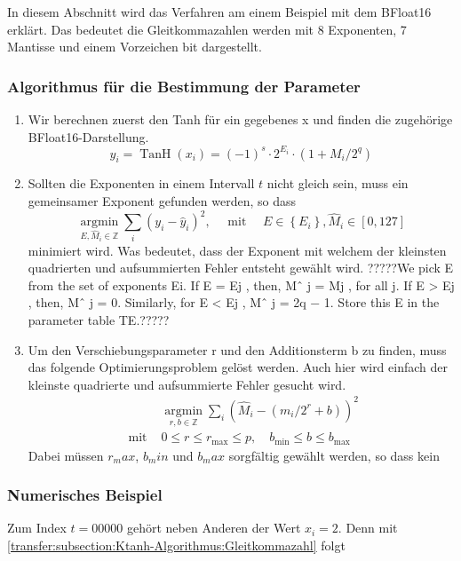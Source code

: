 
In diesem Abschnitt wird das Verfahren am einem Beispiel mit dem BFloat16 erklärt. Das bedeutet die Gleitkommazahlen werden mit 8 Exponenten, 7 Mantisse und einem Vorzeichen bit dargestellt.

\subsubsection{Algorithmus für die Bestimmung der Parameter
	\label{transfer:subsection:Ktanh-Algorithmus:Algo}}

\begin{enumerate}
    \item Wir berechnen zuerst den Tanh für ein gegebenes x und finden die zugehörige BFloat16-Darstellung.
    \[
    y_{i}=\operatorname{TanH}\left(x_{i}\right)=(-1)^{s} \cdot 2^{E_{i}} \cdot\left(1+M_{i} / 2^{q}\right)
    \]
     
    \item Sollten die Exponenten in einem Intervall $t$ nicht gleich sein, muss ein gemeinsamer Exponent gefunden werden, so dass 
    $$
    \underset{E, \hat{M}_{i} \in \mathbb{Z}}{\operatorname{argmin}} \sum_{i}\left(y_{i}-\hat{y}_{i}\right)^{2}, \quad \text { mit } \quad E \in\left\{E_{i}\right\}, \hat{M}_{i} \in[0,127]
    $$
    minimiert wird. Was bedeutet, dass der Exponent mit welchem der kleinsten quadrierten und aufsummierten Fehler entsteht gewählt wird.
    ?????We pick E from the set of exponents {Ei}. If E = Ej ,
    then, Mˆ
    j = Mj , for all j. If E > Ej , then, Mˆ
    j = 0.
    Similarly, for E < Ej , Mˆ
    j = 2q − 1. Store this E in the
    parameter table TE.?????
    \item Um den Verschiebungsparameter r und den Additionsterm b zu finden, muss das folgende Optimierungsproblem gelöst werden. Auch hier wird einfach der kleinste quadrierte und aufsummierte Fehler gesucht wird.
    $$
    \begin{array}{ll} 
    	& \underset{r, b \in \mathbb{Z}}{\operatorname{argmin}} \sum_{i}\left(\hat{M}_{i}-\left(m_{i} / 2^{r}+b\right)\right)^{2} \\
    	\text { mit } & 0 \leq r \leq r_{\max } \leq p, \quad b_{\min } \leq b \leq b_{\max }
    \end{array}
    $$
    Dabei müssen $r_max$, $b_min$ und $b_max$ sorgfältig gewählt werden, so dass kein 
\end{enumerate}

\subsubsection{Numerisches Beispiel
	\label{transfer:subsection:Ktanh-Algorithmus:Num}}
Zum Index $t = 00000$ gehört neben Anderen der Wert $x_i = 2$. Denn mit \ref{transfer:subsection:Ktanh-Algorithmus:Gleitkommazahl} folgt

